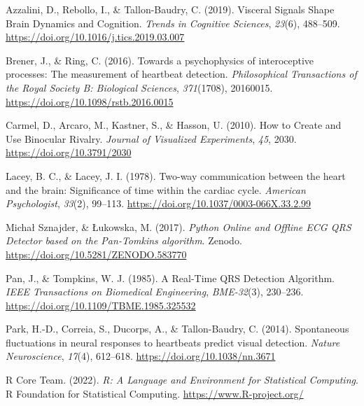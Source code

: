 \documentclass[
  man]{apa6}
\newlength{\cslhangindent}
\newlength{\cslentryspacingunit} %
\newenvironment{CSLReferences}[2] %
 {%
  \setlength{\parindent}{0pt}
  \ifodd #1
  \let\oldpar\par
  \def\par{\hangindent=\cslhangindent\oldpar}
  \fi
  \setlength{\parskip}{#2\cslentryspacingunit}
 }%
 {}
\begin{document}
\hypertarget{refs}{}
\begin{CSLReferences}{1}{0}
\leavevmode{}%
Azzalini, D., Rebollo, I., \& Tallon-Baudry, C. (2019). Visceral {Signals} {Shape} {Brain} {Dynamics} and {Cognition}. \emph{Trends in Cognitive Sciences}, \emph{23}(6), 488--509. \url{https://doi.org/10.1016/j.tics.2019.03.007}

\leavevmode{}%
Brener, J., \& Ring, C. (2016). Towards a psychophysics of interoceptive processes: The measurement of heartbeat detection. \emph{Philosophical Transactions of the Royal Society B: Biological Sciences}, \emph{371}(1708), 20160015. \url{https://doi.org/10.1098/rstb.2016.0015}

\leavevmode{}%
Carmel, D., Arcaro, M., Kastner, S., \& Hasson, U. (2010). How to {Create} and {Use} {Binocular} {Rivalry}. \emph{Journal of Visualized Experiments}, \emph{45}, 2030. \url{https://doi.org/10.3791/2030}

\leavevmode{}%
Lacey, B. C., \& Lacey, J. I. (1978). Two-way communication between the heart and the brain: {Significance} of time within the cardiac cycle. \emph{American Psychologist}, \emph{33}(2), 99--113. \url{https://doi.org/10.1037/0003-066X.33.2.99}

\leavevmode{}%
Michał Sznajder, \& Łukowska, M. (2017). \emph{Python {Online} and {Offline} {ECG} {QRS} {Detector} based on the {Pan}-{Tomkins} algorithm}. Zenodo. \url{https://doi.org/10.5281/ZENODO.583770}

\leavevmode{}%
Pan, J., \& Tompkins, W. J. (1985). A {Real}-{Time} {QRS} {Detection} {Algorithm}. \emph{IEEE Transactions on Biomedical Engineering}, \emph{BME-32}(3), 230--236. \url{https://doi.org/10.1109/TBME.1985.325532}

\leavevmode{}%
Park, H.-D., Correia, S., Ducorps, A., \& Tallon-Baudry, C. (2014). Spontaneous fluctuations in neural responses to heartbeats predict visual detection. \emph{Nature Neuroscience}, \emph{17}(4), 612--618. \url{https://doi.org/10.1038/nn.3671}

\leavevmode{}%
R Core Team. (2022). \emph{R: {A} {Language} and {Environment} for {Statistical} {Computing}}. R Foundation for Statistical Computing. \url{https://www.R-project.org/}


\end{CSLReferences}
\end{document}
